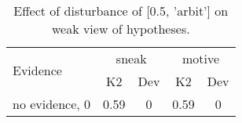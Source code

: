 \begin{table}\begin{tabular}{l|cc|cc}\toprule\multirow{2}{*}{Evidence} & \multicolumn{2}{c}{sneak}& \multicolumn{2}{c}{motive}\\& {K2} & {Dev}& {K2} & {Dev}\\\midrule
no evidence, 0 & \cellcolor{Bittersweet}0.59&\cellcolor{Bittersweet}0&\cellcolor{Bittersweet}0.59&\cellcolor{Bittersweet}0\\\bottomrule\end{tabular}\caption{Effect of disturbance of [0.5, 'arbit'] on weak view of hypotheses.}\end{table}